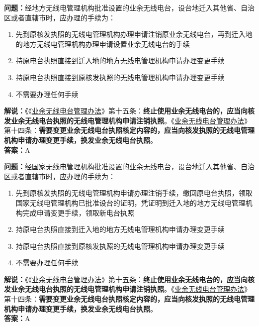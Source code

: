 \textbf{问题：}经地方无线电管理机构批准设置的业余无线电台，设台地迁入其他省、自治区或者直辖市时，应办理的手续为：
\begin{enumerate}[label=\Alph*), leftmargin=1cm]
	\item 先到原核发执照的无线电管理机构办理申请注销原业余无线电台，再到迁入地的地方无线电管理机构办理申请设置业余无线电台的手续
	\item 持原电台执照直接到迁入地的地方无线电管理机构申请办理变更手续
	\item 持原电台执照直接到原核发执照的无线电管理机构申请办理变更手续
	\item 不需要办理任何手续
\end{enumerate}
\textbf{解说：}《《\href{https://www.miit.gov.cn/jgsj/zfs/bmgz/art/2020/art_147b69815b3641caad9047735f94c860.html}{业余无线电台管理办法}》第十五条：\textbf{终止使用业余无线电台的，应当向核发业余无线电台执照的无线电管理机构申请注销执照}。《\href{https://www.miit.gov.cn/jgsj/zfs/bmgz/art/2020/art_147b69815b3641caad9047735f94c860.html}{业余无线电台管理办法}》第十四条：\textbf{需要变更业余无线电台执照核定内容的，应当向核发执照的无线电管理机构申请办理变更手续，换发业余无线电台执照}。\\\textbf{答案：}A%

\textbf{问题：}经国家无线电管理机构批准设置的业余无线电台，设台地迁入其他省、自治区或者直辖市时，应办理的手续为：
\begin{enumerate}[label=\Alph*), leftmargin=1cm]
	\item 先到原核发执照的无线电管理机构申请办理注销手续，缴回原电台执照，领取国家无线电管理机构已批准设台的证明，凭证明到迁入地的地方无线电管理机构完成申请变更手续，领取新电台执照
	\item 持原电台执照直接到迁入地的地方无线电管理机构申请办理变更手续
	\item 持原电台执照直接到原核发执照的无线电管理机构申请办理变更手续
	\item 不需要办理任何手续
\end{enumerate}
\textbf{解说：}《《\href{https://www.miit.gov.cn/jgsj/zfs/bmgz/art/2020/art_147b69815b3641caad9047735f94c860.html}{业余无线电台管理办法}》第十五条：\textbf{终止使用业余无线电台的，应当向核发业余无线电台执照的无线电管理机构申请注销执照}。《\href{https://www.miit.gov.cn/jgsj/zfs/bmgz/art/2020/art_147b69815b3641caad9047735f94c860.html}{业余无线电台管理办法}》第十四条：\textbf{需要变更业余无线电台执照核定内容的，应当向核发执照的无线电管理机构申请办理变更手续，换发业余无线电台执照}。\\\textbf{答案：}A%


